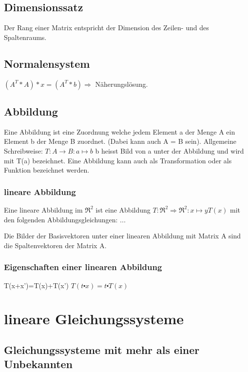 \documentclass[11pt,a4paper,onecolumn]{scrartcl}
\begin{document}
\begin{flushleft}
\subsection{Dimensionssatz}
Der Rang einer Matrix entspricht der Dimension des Zeilen- und des Spaltenraums.
\subsection{Normalensystem}
$(A^T * A)*x = (A^T *b) \Rightarrow$ Näherungslösung.
\subsection{Abbildung}
Eine Abbildung ist eine Zuordnung welche jedem Element a der Menge A ein Element b der Menge B zuordnet. (Dabei kann auch A = B sein).\linebreak
Allgemeine Schreibweise:
$T : A \longrightarrow B : a \mapsto b$
b heisst Bild von a unter der Abbildung und wird mit T(a) bezeichnet.\linebreak
Eine Abbildung kann auch als Transformation oder als Funktion bezeichnet werden.

\subsubsection{lineare Abbildung}
Eine lineare Abbildung im $\Re^{2}$ ist eine Abbildung
$T:\Re^{2} \Rightarrow \Re^{2} : x \mapsto y T(x)$
mit den folgenden Abbildungsgleichungen:
...\linebreak

Die Bilder der Basisvektoren unter einer linearen Abbildung mit Matrix A
sind die Spaltenvektoren der Matrix A.
\subsubsection{Eigenschaften einer linearen Abbildung}
T(x+x')=T(x)+T(x')\linebreak
$T(t\centerdot x) = t \centerdot T(x)$\linebreak



\section{lineare Gleichungssysteme}
\subsection{Gleichungssysteme mit mehr als einer Unbekannten}

\end{flushleft}
\end{document}
